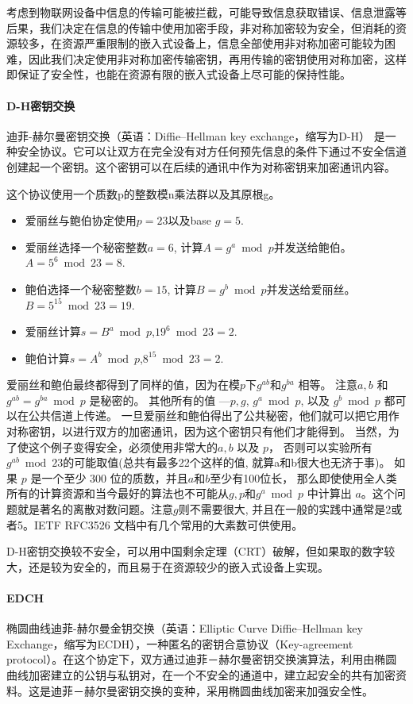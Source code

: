 \documentclass{ctexart}
\begin{document}
考虑到物联网设备中信息的传输可能被拦截，可能导致信息获取错误、信息泄露等后果，我们决定在信息的传输中使用加密手段，非对称加密较为安全，但消耗的资源较多，在资源严重限制的嵌入式设备上，信息全部使用非对称加密可能较为困难，因此我们决定使用非对称加密传输密钥，再用传输的密钥使用对称加密，这样即保证了安全性，也能在资源有限的嵌入式设备上尽可能的保持性能。

\paragraph{D-H密钥交换}
迪菲-赫尔曼密钥交换（英语：Diffie–Hellman key exchange，缩写为D-H） 是一种安全协议。它可以让双方在完全没有对方任何预先信息的条件下通过不安全信道创建起一个密钥。这个密钥可以在后续的通讯中作为对称密钥来加密通讯内容。

这个协议使用一个质数p的整数模n乘法群以及其原根g。
\begin{itemize}
	\item 爱丽丝与鲍伯协定使用$p=23$以及base $g=5$.
	\item 爱丽丝选择一个秘密整数$a=6$, 计算$A = g^a \bmod{p}$并发送给鲍伯。 $A = 5^6 \bmod{23} = 8$.
	\item 鲍伯选择一个秘密整数$b=15$, 计算$B = g^b \bmod{p}$并发送给爱丽丝。 $B = 5^{15} \bmod{23} = 19$.
	\item 爱丽丝计算$s = B^a \bmod{p}$,$19^6 \bmod{23} = 2$.
	\item 鲍伯计算$s = A^b \bmod{p}$,$8^{15} \bmod{23} = 2$.
\end{itemize}
爱丽丝和鲍伯最终都得到了同样的值，因为在模$p$下$g^{ab}和g^{ba}$ 相等。 注意$a, b$ 和 $g^{ab} = g^{ba} \bmod{p}$ 是秘密的。 其他所有的值 —$p, g$, $g^a \bmod{p}$, 以及 $g^b \bmod{p}$ 都可以在公共信道上传递。 一旦爱丽丝和鲍伯得出了公共秘密，他们就可以把它用作对称密钥，以进行双方的加密通讯，因为这个密钥只有他们才能得到。 当然，为了使这个例子变得安全，必须使用非常大的$a, b$ 以及 $p$， 否则可以实验所有$g^{ab} \bmod{23}$的可能取值(总共有最多22个这样的值, 就算a和b很大也无济于事)。 如果 $p$ 是一个至少 300 位的质数，并且$a$和$b$至少有100位长， 那么即使使用全人类所有的计算资源和当今最好的算法也不可能从$g, p$和$g^a \bmod{p}$ 中计算出 $a$。这个问题就是著名的离散对数问题。注意$g$则不需要很大, 并且在一般的实践中通常是2或者5。IETF RFC3526 文档中有几个常用的大素数可供使用。

D-H密钥交换较不安全，可以用中国剩余定理（CRT）破解，但如果取的数字较大，还是较为安全的，而且易于在资源较少的嵌入式设备上实现。

\paragraph{EDCH}
椭圆曲线迪菲-赫尔曼金钥交换（英语：Elliptic Curve Diffie–Hellman key Exchange，缩写为ECDH），一种匿名的密钥合意协议（Key-agreement protocol）。在这个协定下，双方通过迪菲－赫尔曼密钥交换演算法，利用由椭圆曲线加密建立的公钥与私钥对，在一个不安全的通道中，建立起安全的共有加密资料。这是迪菲－赫尔曼密钥交换的变种，采用椭圆曲线加密来加强安全性。
\end{document}
